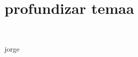 \section{profundizar temaa} 
\textbf{}\\
\begin{flushleft}


\begin{itemize}

jorge


	


\end{itemize} 


\end{flushleft}